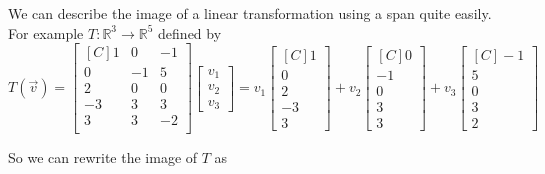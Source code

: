 \begin{example} We can describe the image of a linear transformation using a span quite easily. For example $T:\mathbb{R}^3 \to \mathbb{R}^5$ defined by
\[
T(\vec{v})=\begin{bmatrix*}[C]
1 & 0 & -1 \\
0 & -1 & 5 \\
2 & 0 & 0 \\
-3 & 3 & 3 \\
3 & 3 & -2 \\
\end{bmatrix*}\begin{bmatrix}v_1\\ v_2\\ v_3\end{bmatrix}
=
v_ 1\begin{bmatrix*}[C]1 \\ 0 \\ 2 \\ -3 \\ 3 \end{bmatrix*}
+v_2\begin{bmatrix*}[C]0 \\ -1 \\ 0 \\ 3 \\ 3 \end{bmatrix*}
+v_3\begin{bmatrix*}[C]-1 \\ 5 \\ 0 \\ 3 \\ 2 \end{bmatrix*}
\] 

So we can rewrite the image of $T$ as 


\end{example}
